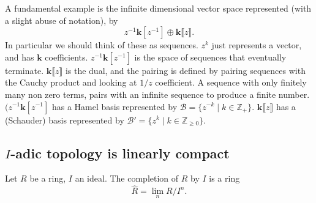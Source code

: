         \begin{ex}
        A fundamental example is the infinite dimensional vector space represented (with a slight abuse of notation), by
        \[ z^{-1} \mathbf{k}[z^{-1}] \oplus \mathbf{k}\lBrack z \rBrack.\]
        In particular we should think of these as sequences. \(z^k\) just represents a vector, and has \( \mathbf{k}\) coefficients. \( z^{-1} \mathbf{k}[z^{-1}] \) is the space of sequences that eventually terminate. \( \mathbf{k}\lBrack z \rBrack\) is the dual, and the pairing is defined by pairing sequences with the Cauchy product and looking at \(1/z\) coefficient. A sequence with only finitely many non zero terms, pairs with an infinite sequence to produce a finite number. 
        \((z^{-1} \mathbf{k}[z^{-1}]\) has a Hamel basis represented by \(\mathcal{B}= \{ z^{-k}\; |\; k \in \mathbb{Z}_{+}\}\). \( \mathbf{k} \lBrack z \rBrack \) has a (Schauder) basis represented by \( \mathcal{B}' = \{ z^{k}\; | \; k \in \mathbb{Z}_{\geq 0}\}\).
        \end{ex} 
        

        
        

        
        
        
        

        \iffalse 
        
        \subsection{\texorpdfstring{\(I\)}{I}-adic topology is linearly compact}
        
        
        Let \(R\) be a ring, \(I\) an ideal. The completion of \(R\) by \(I\) is a ring 
        \[\widehat{R} = \lim_n R/I^n.\]
        
